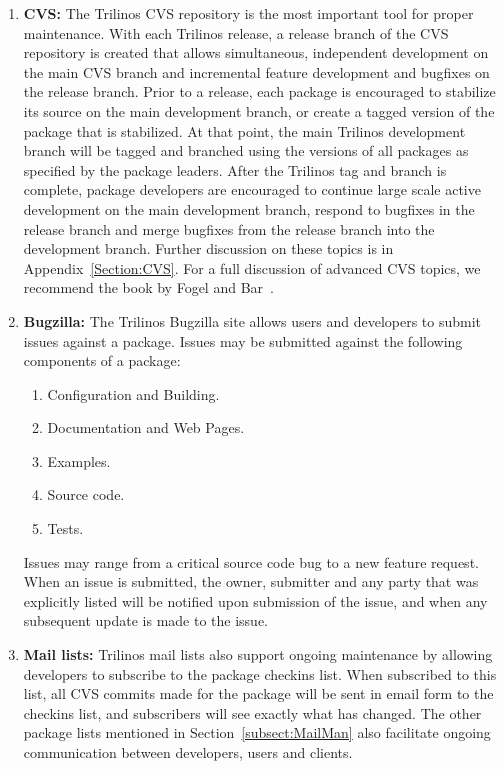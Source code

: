 \documentclass[12pt,relax]{TrilinosDevGuide}
\begin{document}
\begin{enumerate}
\item {\bf CVS:} The Trilinos CVS repository is the most important
tool for proper maintenance.  With each Trilinos release, a release
branch of the CVS repository is
created  that allows simultaneous, independent development on the main
CVS branch and incremental feature development and
bugfixes on the release branch.  Prior to a release, each package is
encouraged to stabilize its source on the main development branch, or
create a tagged version of the package that is stabilized.  At that
point, the main Trilinos development branch will be tagged and
branched using the versions of all packages as specified by the
package leaders.  After the Trilinos tag and branch is complete, 
package developers are encouraged to continue large scale active
development on the main development branch, respond to bugfixes in the
release branch and merge bugfixes from the release branch into the
development branch.  Further discussion on these topics is in 
Appendix~\ref{Section:CVS}.  For a full discussion of advanced CVS
topics, we recommend the book by Fogel and Bar~\cite{FogelBarCVS}.

\item {\bf Bugzilla:} The Trilinos Bugzilla site
allows users and developers to submit issues against a package.
Issues may be submitted against the following components of a package:
\begin{enumerate}
\item Configuration and Building.
\item Documentation and Web Pages.
\item Examples.
\item Source code.
\item Tests.
\end{enumerate}
Issues may range from a critical source code bug to a new feature
request.  When an issue is submitted, the owner, submitter and any
party that was explicitly listed will be notified upon submission of
the issue, and when any subsequent update is made to the issue.

\item {\bf Mail lists:} 
Trilinos mail lists also support ongoing maintenance by allowing
developers to subscribe to the package checkins list.  When subscribed
to this list, all CVS commits made for the package will be sent in
email form to the checkins list, and subscribers will see exactly what
has changed. The other package lists mentioned in 
Section~\ref{subsect:MailMan} also facilitate ongoing
communication between developers, users and clients.


\end{enumerate}
\end{document}
